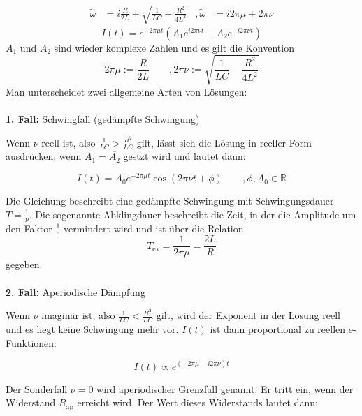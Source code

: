 \begin{align*}
    \tilde{\omega} &= i \frac{R}{2L} \pm \sqrt{\frac{1}{LC}- \frac{R^2}{4L^2}} & ,\tilde{\omega} &= i2 \pi \mu \pm 2\pi \nu
\end{align*}
\begin{equation}
    \label{eqn:RLC_lsg}
    I(t) = e^{-2 \pi \mu t} (A_1e^{i2 \pi \nu t} + A_2e^{-i2 \pi \nu t})
\end{equation}
$A_1$ und $A_2$ sind wieder komplexe Zahlen und es gilt die Konvention 
\begin{equation}
    \label{eqn:def_mu_nu}
    2\pi \mu := \frac{R}{2L} \qquad , 2\pi \nu := \sqrt{\frac{1}{LC}- \frac{R^2}{4L^2}}
\end{equation}
Man unterscheidet zwei allgemeine Arten von Lösungen:\\
\\
\textbf{1. Fall:} Schwingfall (gedämpfte Schwingung)

Wenn $\nu$ reell ist, also $\frac{1}{LC} > \frac{R^2}{LC}$ gilt, lässt sich die Lösung 
in reeller Form ausdrücken, wenn $A_1 = \overline{A_2}$ gestzt wird und lautet dann:

\begin{equation}
    I(t) = A_0e^{-2\pi \mu t}\cos(2\pi \nu t + \phi) \qquad , \phi, A_0 \in \mathbb{R}
\end{equation}

Die Gleichung beschreibt eine gedämpfte Schwingung mit Schwingungsdauer $T = \frac{1}{\nu}$.
Die sogenannte Abklingdauer beschreibt die Zeit, in der die Amplitude um den Faktor $\frac{1}{e}$ vermindert
wird und ist über die Relation 
\begin{equation}
    \label{eqn:T_ex}
    T_\text{ex} = \frac{1}{2\pi\mu} = \frac{2L}{R}
\end{equation}
gegeben. \\
\\
\textbf{2. Fall:} Aperiodische Dämpfung

Wenn $\nu$ imaginär ist, also $\frac{1}{LC} < \frac{R^2}{LC}$ gilt, wird der Exponent in der Lösung reell
und es liegt keine Schwingung mehr vor. $I(t)$ ist dann proportional zu reellen e-Funktionen:

\begin{equation}
    I(t) \propto e^{(-2\pi\mu-i2\pi\nu)t}
\end{equation}

Der Sonderfall $\nu = 0$ wird aperiodischer Grenzfall genannt. Er tritt ein, wenn der Widerstand $R_\text{ap}$
erreicht wird. Der Wert dieses Widerstands lautet dann:

